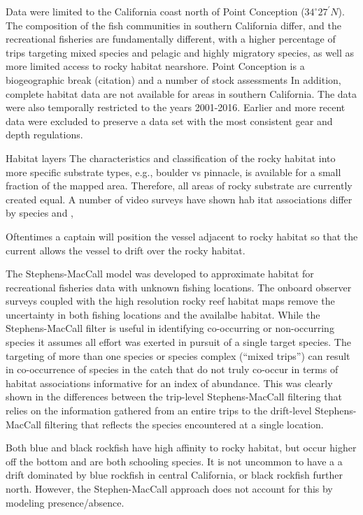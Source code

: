 \documentclass[
  12pt,
  authoryear,
  preprint,
  3p]{elsarticle}
\begin{document}
Data were limited to the California coast north of Point Conception
(\(34^\circ 27^\prime N\)). The composition of the fish communities in
southern California differ, and the recreational fisheries are
fundamentally different, with a higher percentage of trips targeting
mixed species and pelagic and highly migratory species, as well as more
limited access to rocky habitat nearshore. Point Conception is a
biogeographic break (citation) and a number of stock assessments In
addition, complete habitat data are not available for areas in southern
California. The data were also temporally restricted to the years
2001-2016. Earlier and more recent data were excluded to preserve a data
set with the most consistent gear and depth regulations.

Habitat layers The characteristics and classification of the rocky
habitat into more specific substrate types, e.g., boulder vs pinnacle,
is available for a small fraction of the mapped area. Therefore, all
areas of rocky substrate are currently created equal. A number of video
surveys have shown hab itat associations differ by species and ,

Oftentimes a captain will position the vessel adjacent to rocky habitat
so that the current allows the vessel to drift over the rocky habitat.

The Stephens-MacCall model was developed to approximate habitat for
recreational fisheries data with unknown fishing locations. The onboard
observer surveys coupled with the high resolution rocky reef habitat
maps remove the uncertainty in both fishing locations and the availalbe
habitat. While the Stephens-MacCall filter is useful in identifying
co-occurring or non-occurring species it assumes all effort was exerted
in pursuit of a single target species. The targeting of more than one
species or species complex (``mixed trips'') can result in co-occurrence
of species in the catch that do not truly co-occur in terms of habitat
associations informative for an index of abundance. This was clearly
shown in the differences between the trip-level Stephens-MacCall
filtering that relies on the information gathered from an entire trips
to the drift-level Stephens-MacCall filtering that reflects the species
encountered at a single location.

Both blue and black rockfish have high affinity to rocky habitat, but
occur higher off the bottom and are both schooling species. It is not
uncommon to have a a drift dominated by blue rockfish in central
California, or black rockfish further north. However, the
Stephen-MacCall approach does not account for this by modeling
presence/absence.
\end{document}

